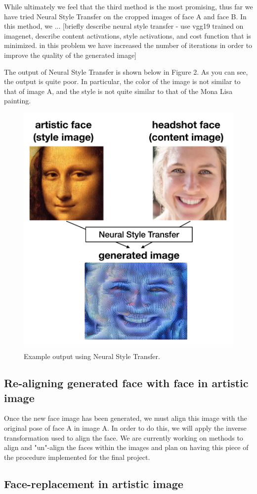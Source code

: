 \documentclass{pnastwo2}
\begin{document}
\begin{article}
While ultimately we feel that the third method is the most promising, thus far we have tried Neural Style Transfer on the cropped images of face A and face B. In this method, we ... [briefly describe neural style transfer - use vgg19 trained on imagenet, describe content activations, style activations, and cost function that is minimized. in this problem we have increased the number of iterations in order to improve the quality of the generated image]

The output of Neural Style Transfer is shown below in Figure 2. As you can see, the output is quite poor. In particular, the color of the image is not similar to that of image A, and the style is not quite similar to that of the Mona Lisa painting. 

\begin{figure}[ht]
	\begin{center}
		\includegraphics[width=.4\textwidth]{neural_style_transfer_output}
		\caption{Example output using Neural Style Transfer.} \label{fig:nst}
	\end{center}
\end{figure} 

\subsection{Re-aligning generated face with face in artistic image}

Once the new face image has been generated, we must align this image with the original pose of face A in image A. In order to do this, we will apply the inverse transformation used to align the face. We are currently working on methods to align and "un"-align the faces within the images and plan on having this piece of the procedure implemented for the final project. 

\subsection{Face-replacement in artistic image}


\end{article}
\end{document}
